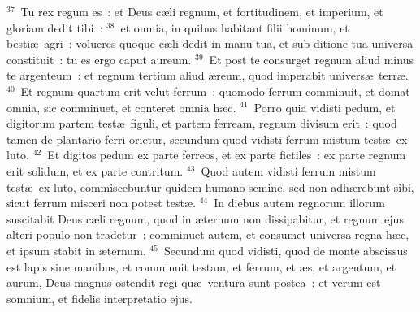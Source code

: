 ${}^{37}$~Tu rex regum es~: et Deus c\ae li regnum, et fortitudinem, et imperium, et gloriam dedit tibi~:
${}^{38}$~et omnia, in quibus habitant filii hominum, et besti\ae\ agri~: volucres quoque c\ae li dedit in manu tua, et sub ditione tua universa constituit~: tu es ergo caput aureum.
${}^{39}$~Et post te consurget regnum aliud minus te argenteum~: et regnum tertium aliud \ae reum, quod imperabit univers\ae\ terr\ae .
${}^{40}$~Et regnum quartum erit velut ferrum~: quomodo ferrum comminuit, et domat omnia, sic comminuet, et conteret omnia h\ae c.
${}^{41}$~Porro quia vidisti pedum, et digitorum partem test\ae\ figuli, et partem ferream, regnum divisum erit~: quod tamen de plantario ferri orietur, secundum quod vidisti ferrum mistum test\ae\ ex luto.
${}^{42}$~Et digitos pedum ex parte ferreos, et ex parte fictiles~: ex parte regnum erit solidum, et ex parte contritum.
${}^{43}$~Quod autem vidisti ferrum mistum test\ae\ ex luto, commiscebuntur quidem humano semine, sed non adh\ae rebunt sibi, sicut ferrum misceri non potest test\ae .
${}^{44}$~In diebus autem regnorum illorum suscitabit Deus c\ae li regnum, quod in \ae ternum non dissipabitur, et regnum ejus alteri populo non tradetur~: comminuet autem, et consumet universa regna h\ae c, et ipsum stabit in \ae ternum.
${}^{45}$~Secundum quod vidisti, quod de monte abscissus est lapis sine manibus, et comminuit testam, et ferrum, et \ae s, et argentum, et aurum, Deus magnus ostendit regi qu\ae\ ventura sunt postea~: et verum est somnium, et fidelis interpretatio ejus.


